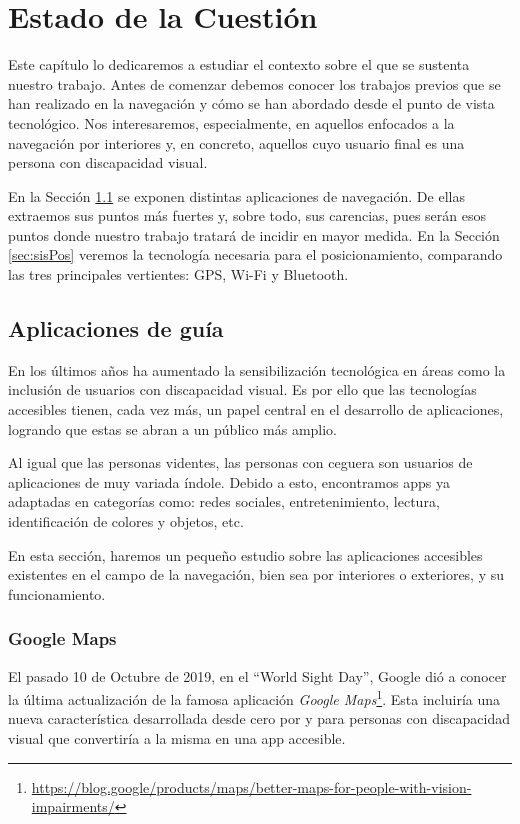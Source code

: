 \chapter{Estado de la Cuestión}
\label{cap:estadoDeLaCuestion}

Este capítulo lo dedicaremos a estudiar el contexto sobre el que se sustenta nuestro trabajo. Antes de comenzar debemos conocer los trabajos previos que se han realizado en la navegación y cómo se han abordado desde el punto de vista tecnológico. Nos interesaremos, especialmente, en aquellos enfocados a la navegación por interiores y, en concreto, aquellos cuyo usuario final es una persona con discapacidad visual. 

En la Sección \ref{sec:appGuia} se exponen distintas aplicaciones de navegación. De ellas extraemos sus puntos más fuertes y, sobre todo, sus carencias, pues serán esos puntos donde nuestro trabajo tratará de incidir en mayor medida. En la Sección \ref{sec:sisPos} veremos la tecnología necesaria para el posicionamiento, comparando las tres principales vertientes: GPS, Wi-Fi y Bluetooth.

\section{Aplicaciones de guía}
\label{sec:appGuia}
En los últimos años ha aumentado la sensibilización tecnológica en áreas como la inclusión de usuarios con discapacidad visual. Es por ello que las tecnologías accesibles tienen, cada vez más, un papel central en el desarrollo de aplicaciones, logrando que estas se abran a un público más amplio.


Al igual que las personas videntes, las personas con ceguera son usuarios de aplicaciones de muy variada índole. Debido a esto, encontramos apps ya adaptadas en categorías como: redes sociales, entretenimiento, lectura, identificación de colores y objetos, etc. 

En esta sección, haremos un pequeño estudio sobre las aplicaciones accesibles existentes en el campo de la navegación, bien sea por interiores o exteriores, y su funcionamiento.
\subsection{Google Maps}
El pasado 10 de Octubre de 2019, en el ``World Sight Day'', Google dió a conocer la última actualización de la famosa aplicación \textit{Google Maps}\footnote{\url{https://blog.google/products/maps/better-maps-for-people-with-vision-impairments/}}. Esta incluiría una nueva característica desarrollada desde cero por y para personas con discapacidad visual que convertiría a la misma en una app accesible.

